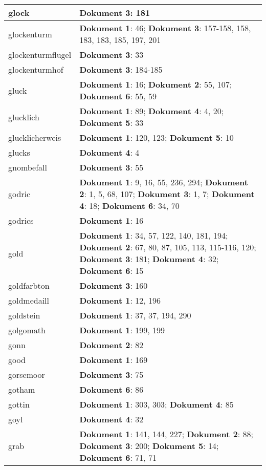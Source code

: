 \documentclass[a5paper]{article}
\begin{document}
\begin{longtable}[l]{|l|p{3in}|}
\hline
glock & \textbf{Dokument 3}: 181 \\
\hline
glockenturm & \textbf{Dokument 1}: 46; \textbf{Dokument 3}: 157-158, 158, 183, 183, 185, 197, 201 \\
\hline
glockenturmflugel & \textbf{Dokument 3}: 33 \\
\hline
glockenturmhof & \textbf{Dokument 3}: 184-185 \\
\hline
gluck & \textbf{Dokument 1}: 16; \textbf{Dokument 2}: 55, 107; \textbf{Dokument 6}: 55, 59 \\
\hline
glucklich & \textbf{Dokument 1}: 89; \textbf{Dokument 4}: 4, 20; \textbf{Dokument 5}: 33 \\
\hline
glucklicherweis & \textbf{Dokument 1}: 120, 123; \textbf{Dokument 5}: 10 \\
\hline
glucks & \textbf{Dokument 4}: 4 \\
\hline
gnombefall & \textbf{Dokument 3}: 55 \\
\hline
godric & \textbf{Dokument 1}: 9, 16, 55, 236, 294; \textbf{Dokument 2}: 1, 5, 68, 107; \textbf{Dokument 3}: 1, 7; \textbf{Dokument 4}: 18; \textbf{Dokument 6}: 34, 70 \\
\hline
godrics & \textbf{Dokument 1}: 16 \\
\hline
gold & \textbf{Dokument 1}: 34, 57, 122, 140, 181, 194; \textbf{Dokument 2}: 67, 80, 87, 105, 113, 115-116, 120; \textbf{Dokument 3}: 181; \textbf{Dokument 4}: 32; \textbf{Dokument 6}: 15 \\
\hline
goldfarbton & \textbf{Dokument 3}: 160 \\
\hline
goldmedaill & \textbf{Dokument 1}: 12, 196 \\
\hline
goldstein & \textbf{Dokument 1}: 37, 37, 194, 290 \\
\hline
golgomath & \textbf{Dokument 1}: 199, 199 \\
\hline
gonn & \textbf{Dokument 2}: 82 \\
\hline
good & \textbf{Dokument 1}: 169 \\
\hline
gorsemoor & \textbf{Dokument 3}: 75 \\
\hline
gotham & \textbf{Dokument 6}: 86 \\
\hline
gottin & \textbf{Dokument 1}: 303, 303; \textbf{Dokument 4}: 85 \\
\hline
goyl & \textbf{Dokument 4}: 32 \\
\hline
grab & \textbf{Dokument 1}: 141, 144, 227; \textbf{Dokument 2}: 88; \textbf{Dokument 3}: 200; \textbf{Dokument 5}: 14; \textbf{Dokument 6}: 71, 71 \\

\end{longtable}
\end{document}
